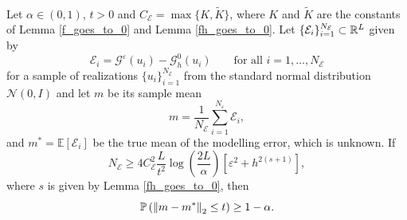 \documentclass[10pt]{article}
\begin{document}
\begin{proposition}
\label{inequality_modelling_error}
\leavevmode \\
Let $\alpha \in (0,1)$, $t > 0$ and $C_{\mathcal{E}} = \max \{ K, \tilde{K} \}$, where $K$ and $\tilde{K}$ are the constants of Lemma \ref{f_goes_to_0} and Lemma \ref{fh_goes_to_0}. Let $\{ \mathcal{E}_i \}_{i=1}^{N_{\mathcal{E}}} \subset \mathbb{R}^L$ given by
\[ \mathcal{E}_i = \mathcal{G}^{\varepsilon}(u_i) - \mathcal{G}^0_h(u_i) \qquad \text{for all } i = 1, \dots, N_{\mathcal{E}} \]
for a sample of realizations $\{ u_i \}_{i=1}^{N_{\mathcal{E}}}$ from the standard normal distribution $\mathcal{N}(0,I)$ and let $m$ be its sample mean
\[ m = \frac{1}{N_{\mathcal{E}}} \sum_{i=1}^{N_{\varepsilon}} \mathcal{E}_i, \]
and $m^* = \mathbb{E}[\mathcal{E}_i]$ be the true mean of the modelling error, which is unknown. If
\[ N_{\mathcal{E}} \ge 4 C_{\mathcal{E}}^2 \frac{L}{t^2} \log \left ( \frac{2L}{\alpha} \right ) \left [ \varepsilon^2 + h^{2(s+1)} \right ], \]
where $s$ is given by Lemma \ref{fh_goes_to_0}, then
\[ \mathbb{P} \left ( \left\|m - m^*\right\|_2 \le t \right ) \ge 1 - \alpha. \]
\end{proposition}
\end{document}
